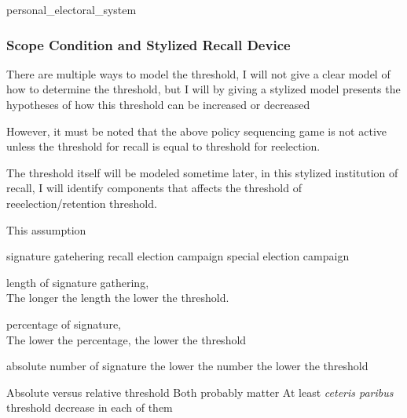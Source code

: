\documentclass[hyphens, crop=false]{standalone}
\begin{document}
			{personal_electoral_system}
		
		\subsubsection*{Scope Condition and Stylized Recall Device}
		
		There are multiple ways to model the threshold,
		I will not give a clear model of how to determine the threshold,
		but I will by giving a stylized model presents
		the hypotheses of how this threshold
		can be increased or decreased
		
		
		However, it must be noted that the above policy sequencing game is not active
		unless the threshold for recall is equal to threshold for reelection.
		
		The threshold itself will be modeled sometime later,
		in this stylized institution of recall,
		I will identify components that
		affects the threshold of reeelection/retention threshold.
		
		
		This assumption 
		
		signature gatehering
		recall election campaign
		special election campaign
		
		
		length of signature gathering,\\
		The longer the length the lower the threshold.
		
		percentage of signature,\\
		The lower the percentage,
		the lower the threshold
		
		absolute number of signature
		the lower the number
		the lower the threshold
		
		Absolute versus relative threshold
		Both probably matter
		At least
		\textit{ceteris paribus}
		threshold decrease in each of them
		
\end{document}
